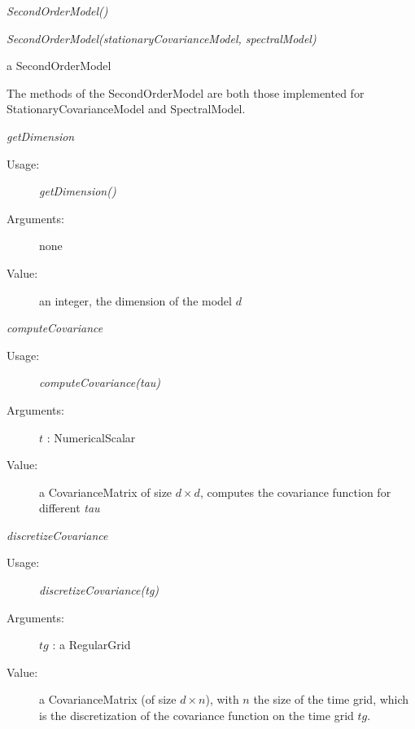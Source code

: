 \begin{description}

\item[Usage:] \rule{0pt}{1em}
\begin{description}
\item \textit{SecondOrderModel()}
\item \textit{SecondOrderModel(stationaryCovarianceModel, spectralModel)}
\end{description}
\bigskip

\item[Arguments:]  \rule{0pt}{1em}

\bigskip

\item[Value:] a SecondOrderModel
\bigskip

\item[Some methods :]  \rule{0pt}{1em}

The methods of the SecondOrderModel are both those implemented for StationaryCovarianceModel and SpectralModel.

\begin{description}

\item \textit{getDimension}
\begin{description}
\item[Usage:] \textit{getDimension()}
\item[Arguments:] none
\item[Value:]   an integer, the dimension of the model $d$
\end{description}
\bigskip

\item \textit{computeCovariance}
\begin{description}
\item[Usage:] \textit{computeCovariance(tau)}
\item[Arguments:] $t$ : NumericalScalar
\item[Value:] a CovarianceMatrix of size $d\times d$, computes the covariance function for different \textit{tau}
\end{description}
\bigskip

\item \textit{discretizeCovariance}
\begin{description}
\item[Usage:] \textit{discretizeCovariance(tg)}
\item[Arguments:] $tg$ :  a RegularGrid
\item[Value:] a CovarianceMatrix (of size $d\times  n$), with $n$ the size of the time grid,
which is the discretization of the covariance function on the time grid $tg$.
\end{description}
\bigskip


\end{description}
\end{description}
